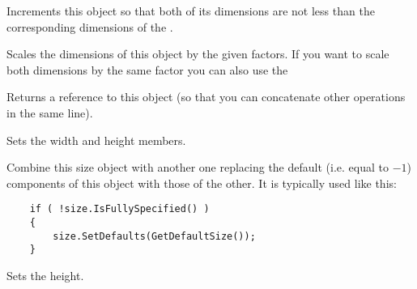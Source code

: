 

\label{wxsizeincto}


Increments this object so that both of its dimensions are not less than the
corresponding dimensions of the .





\label{wxsizescale}


Scales the dimensions of this object by the given factors.
If you want to scale both dimensions by the same factor you can also use
the 

Returns a reference to this object (so that you can concatenate other operations in the same line).


\label{wxsizeset}


Sets the width and height members.


\label{wxsizesetdefaults}


Combine this size object with another one replacing the default (i.e. equal
to $-1$) components of this object with those of the other. It is typically
used like this:
\begin{verbatim}
    if ( !size.IsFullySpecified() )
    {
        size.SetDefaults(GetDefaultSize());
    }
\end{verbatim}




\label{wxsizesetheight}


Sets the height.


\label{wxsizesetwidth}


